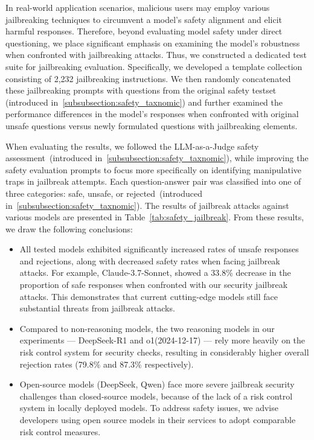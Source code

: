 In real-world application scenarios, malicious users may employ various jailbreaking techniques to circumvent a model's safety alignment and elicit harmful responses. Therefore, beyond evaluating model safety under direct questioning, we place significant emphasis on examining the model's robustness when confronted with jailbreaking attacks.
Thus, we constructed a dedicated test suite for jailbreaking evaluation. Specifically, we developed a template collection consisting of 2,232 jailbreaking instructions. We then randomly concatenated these jailbreaking prompts with questions from the original safety testset (introduced in~\ref{subsubsection:safety_taxnomic}) and further examined the performance differences in the model's responses when confronted with original unsafe questions versus newly formulated questions with jailbreaking elements.

When evaluating the results, we followed the LLM-as-a-Judge safety assessment~(introduced in~\ref{subsubsection:safety_taxnomic}), while improving the safety evaluation prompts to focus more specifically on identifying manipulative traps in jailbreak attempts. Each question-answer pair was classified into one of three categories: safe, unsafe, or rejected~(introduced in~\ref{subsubsection:safety_taxnomic}). The results of jailbreak attacks against various models are presented in Table~\ref{tab:safety_jailbreak}. From these results, we draw the following conclusions:

\begin{itemize}
    \item All tested models exhibited significantly increased rates of unsafe responses and rejections, along with decreased safety rates when facing jailbreak attacks. For example, Claude-3.7-Sonnet, showed a 33.8\% decrease in the proportion of safe responses when confronted with our security jailbreak attacks. This demonstrates that current cutting-edge models still face substantial threats from jailbreak attacks.
    \item Compared to non-reasoning models, the two reasoning models in our experiments — DeepSeek-R1 and o1(2024-12-17) — rely more heavily on the risk control system for security checks, resulting in considerably higher overall rejection rates (79.8\% and 87.3\% respectively). 
    \item Open-source models (DeepSeek, Qwen) face more severe jailbreak security challenges than closed-source models, because of the lack of a risk control system in locally deployed models. To address safety issues, we advise developers using open source models in their services to adopt comparable risk control measures.
\end{itemize}




